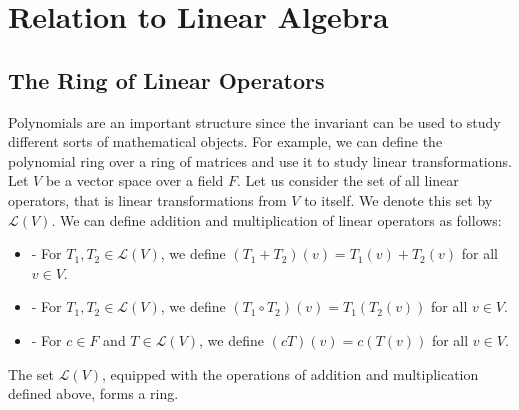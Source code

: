 \documentclass[openany]{book}
\begin{document}
\chapter{Relation to Linear Algebra}
\section{The Ring of Linear Operators}
Polynomials are an important structure since the invariant can be used to study different sorts of mathematical objects. For example, we can define the polynomial ring over a ring of matrices and use it to study linear transformations. \\
Let $V$ be a vector space over a field $F$. Let us consider the set of all linear operators, that is linear transformations from $V$ to itself. We denote this set by $\mathcal{L}(V)$. We can define addition and multiplication of linear operators as follows:
\begin{itemize}
    \item {} - For $T_1, T_2 \in \mathcal{L}(V)$, we define $(T_1 + T_2)(v) = T_1(v) + T_2(v)$ for all $v \in V$.
    \item {} - For $T_1, T_2 \in \mathcal{L}(V)$, we define $(T_1 \circ T_2)(v) = T_1(T_2(v))$ for all $v \in V$.
    \item {} - For $c \in F$ and $T \in \mathcal{L}(V)$, we define $(cT)(v) = c(T(v))$ for all $v \in V$.
\end{itemize}
\begin{mytheorem}
The set $\mathcal{L}(V)$, equipped with the operations of addition and multiplication defined above, forms a ring.
\end{mytheorem}
\end{document}
